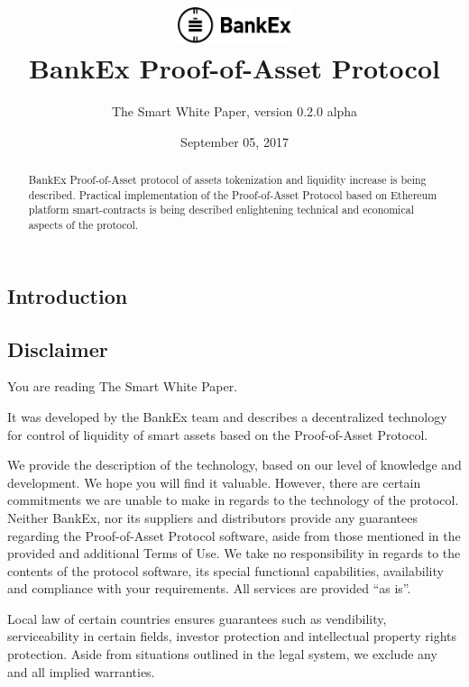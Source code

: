 \documentclass{article}
\title{\vspace{-3.85em}\includegraphics[width=0.25\textwidth]{logo.pdf} \\ \vspace{24pt} BankEx Proof-of-Asset Protocol}
\author{The Smart White Paper, version 0.2.0 alpha}
\date{September 05, 2017}
\begin{document}
\maketitle

\begin{abstract}
BankEx Proof-of-Asset protocol of assets tokenization and liquidity increase is being described. Practical implementation of the Proof-of-Asset Protocol based on Ethereum platform smart-contracts is being described enlightening technical and economical aspects of the protocol.
\end{abstract}

\vspace{24pt}

\begin{multicols}{2}

\tableofcontents

\section{Introduction}

\subsection{Disclaimer}

You are reading The Smart White Paper.

It was developed by the BankEx team and describes a decentralized technology for control of liquidity of smart assets based on the Proof-of-Asset Protocol.
	
We provide the description of the technology, based on our level of knowledge and development. We hope you will find it valuable. However, there are certain commitments we are unable to make in regards to the technology of the protocol.  
Neither BankEx, nor its suppliers and distributors provide any guarantees regarding the Proof-of-Asset Protocol software, aside from those mentioned in the provided and additional Terms of Use. We take no responsibility in regards to the contents of the protocol software, its special functional capabilities, availability and compliance with your requirements. All services are provided \enquote{as is}.

Local law of certain countries ensures guarantees such as vendibility, serviceability in certain fields, investor protection and intellectual property rights protection. Aside from situations outlined in the legal system, we exclude any and all implied warranties.


\end{multicols}
\end{document}
